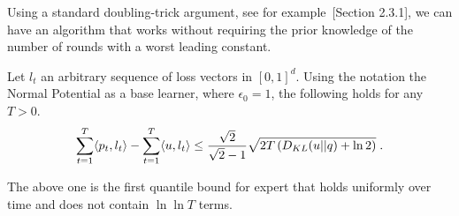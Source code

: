 Using a standard doubling-trick argument, see for example~\citet{Shalev-Shwartz12}[Section 2.3.1], we can have an algorithm that works without requiring the prior knowledge of the number of rounds with a worst leading constant.

\begin{cor}
\label{cor:kt_expert_no_t}
Let $l_t$ an arbitrary sequence of loss vectors in $[0,1]^d$. Using the notation the Normal Potential as a base learner, where $\epsilon_0=1$, the following holds for any $T>0$.
\[
\sum_{t=1}^T \langle p_t, l_t\rangle -\sum_{t=1}^T \langle u , l_t\rangle 
\leq \frac{\sqrt{2}}{\sqrt{2}-1}\sqrt{2 T \left(D_{KL}(u||q) +\ln 2 \right)} \; .
\]
\end{cor}

The above one is the first quantile bound for expert that holds uniformly over time and does not contain $\ln \ln T$ terms.